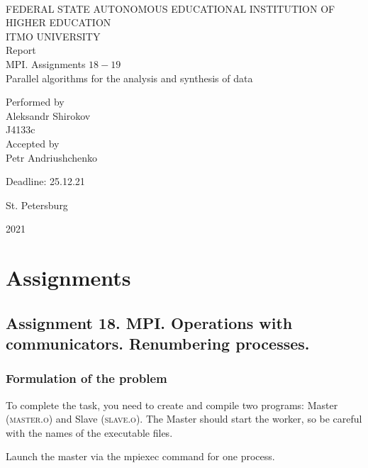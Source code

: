\documentclass[%
12pt, %
final, %
oneside, %
onecolumn, %
centertags]{article} %
\theoremstyle{plain}
\theoremstyle{definition}
\theoremstyle{remark}
\begin{document}
	\begin{titlepage} 
		\begin{center}
		\textbf{}\\[2.0cm]
		\LARGE FEDERAL STATE AUTONOMOUS EDUCATIONAL INSTITUTION OF HIGHER EDUCATION \\[0.5cm]
		\Large ITMO UNIVERSITY \\[3cm]
		\LARGE Report\\
		\Large MPI. Assignments $18-19$ \\
		\Large Parallel algorithms for the analysis and synthesis of data \\[4cm]


		\begin{flushright}
		Performed by\\
		Aleksandr Shirokov\\
		J4133c\\
		Accepted by\\
		Petr Andriushchenko

		Deadline: 25.12.21
		\end{flushright}

		\vfill 

		{\Large {St. Petersburg}} \par
		{\Large {2021}}
		\end{center} 
	\end{titlepage}

\tableofcontents
\newpage


\section{Assignments}

\subsection{Assignment 18. MPI. Operations with communicators. Renumbering processes.}

\subsubsection{Formulation of the problem}

To complete the task, you need to create and compile two programs: Master (\textsc{master.o}) and Slave (\textsc{slave.o}). 
The Master should start the worker, so be careful with the names of the executable files.

Launch the master via the mpiexec command for one process.
\end{document}
